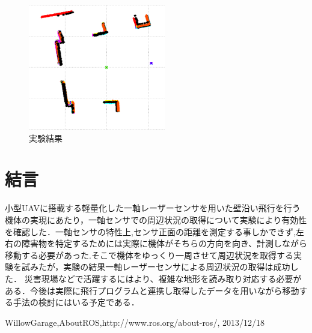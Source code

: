 \documentclass[twocolumn,11pt]{sotsuken_abst}
\begin{document}
\begin{figure}[htbp]
  \begin{center}
    \includegraphics[width=60mm]{img/keka1.png}
    \end{center}
  \caption{実験結果}
 \label{fig:keka1.png}
\end{figure}

\section{結言}
小型UAVに搭載する軽量化した一軸レーザーセンサを用いた壁沿い飛行を行う機体の実現にあたり，一軸センサでの周辺状況の取得について実験により有効性を確認した．一軸センサの特性上,センサ正面の距離を測定する事しかできず,左右の障害物を特定するためには実際に機体がそちらの方向を向き、計測しながら移動する必要があった.そこで機体をゆっくり一周させて周辺状況を取得する実験を試みたが，実験の結果一軸レーザーセンサによる周辺状況の取得は成功した．
災害現場などで活躍するにはより、複雑な地形を読み取り対応する必要がある．今後は実際に飛行プログラムと連携し取得したデータを用いながら移動する手法の検討にはいる予定である．

\begin{thebibliography}{8}
 WillowGarage,AboutROS,http://www.ros.org/\linebreak about-ros/, 2013/12/18
\end{thebibliography}
\end{document}
